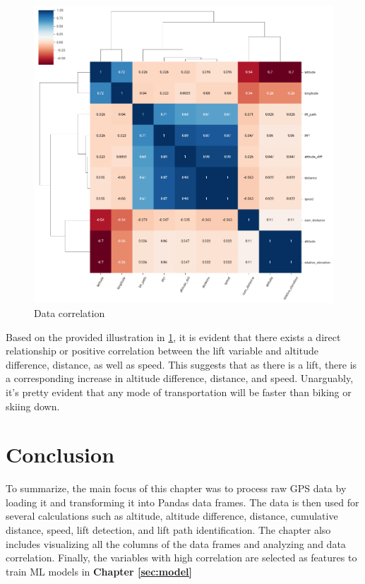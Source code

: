 \begin{figure}[htb]
	\includegraphics[width=\textwidth]{resources/correlation.png}
	\caption{Data correlation}
	\label{fig:correlation}
\end{figure}

Based on the provided illustration in  \ref*{fig:correlation}, it is evident that there exists a direct relationship or positive correlation between the lift variable and altitude difference, distance, as well as speed. This suggests that as there is a lift, there is a corresponding increase in altitude difference, distance, and speed. Unarguably, it's pretty evident that any mode of transportation will be faster than biking or skiing down.

\section{Conclusion}
\label{sec:data:conclusion}

To summarize, the main focus of this chapter was to process raw GPS data by loading it and transforming it into Pandas data frames. The data is then used for several calculations such as altitude, altitude difference, distance, cumulative distance, speed, lift detection, and lift path identification. The chapter also includes visualizing all the columns of the data frames and analyzing and data correlation. Finally, the variables with high correlation are selected as features to train ML models in
\textbf{Chapter \ref{sec:model}}

